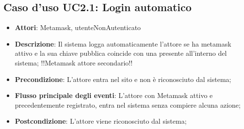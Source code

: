 \subsection{Caso d'uso \texorpdfstring{UC2.1}{UC2.1}: Login automatico}
\begin{itemize}
\item \textbf{Attori}: Metamask, utenteNonAutenticato
\item \textbf{Descrizione}: Il sistema logga automaticamente l'attore se ha metamask attivo e la sua chiave pubblica coincide con una presente all'interno del sistema;
!!Metamask attore secondario!!
\item \textbf{Precondizione}: L'attore entra nel sito e non è riconosciuto dal sistema;
\item \textbf{Flusso principale degli eventi}: L'attore con Metamask attivo e precedentemente registrato, entra nel sistema senza compiere alcuna azione;
\item \textbf{Postcondizione}: L'attore viene riconosciuto dal sistema;
\end{itemize}
